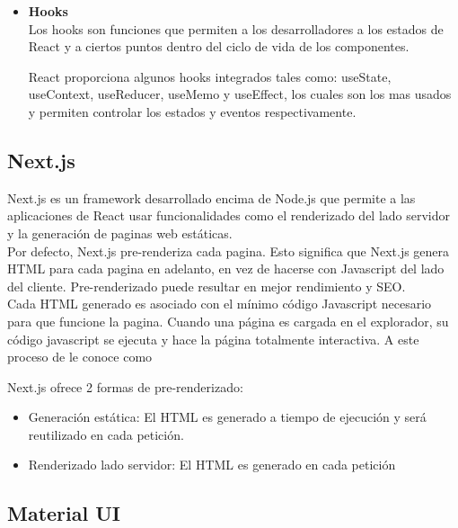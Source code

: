 \begin{itemize}
            \item \textbf{Hooks} \hfill \\

            Los hooks son funciones que permiten a los desarrolladores  a los estados de React y a ciertos puntos dentro del ciclo de vida de los componentes.

            React proporciona algunos hooks integrados tales como: useState, useContext, useReducer, useMemo y useEffect, los cuales son los mas usados y permiten controlar los estados y eventos respectivamente.


        \end{itemize}
        
    \subsection{Next.js}

        Next.js es un framework desarrollado encima de Node.js que permite a las aplicaciones de React usar funcionalidades como el renderizado del lado servidor y la generación de paginas web estáticas.\\

        Por defecto, Next.js pre-renderiza cada pagina. Esto significa que Next.js genera HTML para cada pagina en adelanto, en vez de hacerse con Javascript del lado del cliente. Pre-renderizado puede resultar en mejor rendimiento y SEO.\\

        Cada HTML generado es asociado con el mínimo código Javascript necesario para que funcione la pagina. Cuando una página es cargada en el explorador, su código javascript se ejecuta y hace la página totalmente interactiva. A este proceso de le conoce como 

        Next.js ofrece 2 formas de pre-renderizado: 

        \begin{itemize}
            \item Generación estática: El HTML es generado a tiempo de ejecución y será reutilizado en cada petición.
            \item Renderizado lado servidor: El HTML es generado en cada petición
        \end{itemize}

    \subsection{Material UI}


